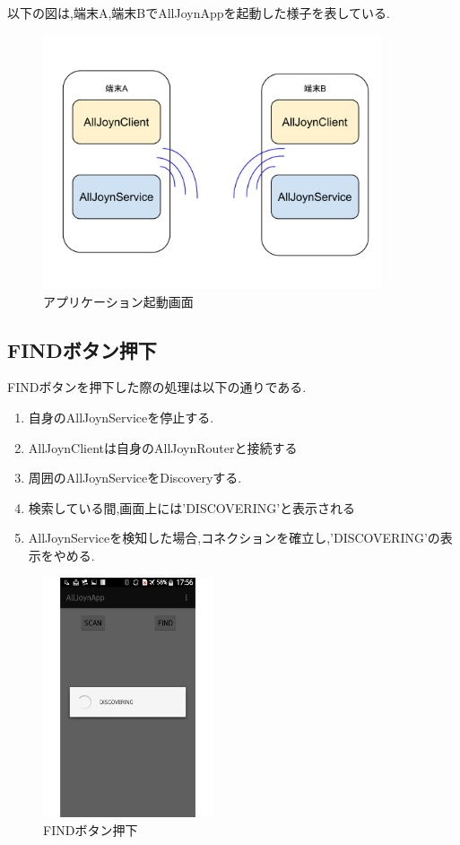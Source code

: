 以下の図は,端末A,端末BでAllJoynAppを起動した様子を表している.

\begin{figure}[htbp]
\centering
\includegraphics[width=10cm]{fig/appstart.pdf}
\caption{アプリケーション起動画面}
\end{figure}



\subsection{FINDボタン押下}
FINDボタンを押下した際の処理は以下の通りである.

\begin{enumerate}
\item 自身のAllJoynServiceを停止する.
\item AllJoynClientは自身のAllJoynRouterと接続する
\item 周囲のAllJoynServiceをDiscoveryする.
\item 検索している間,画面上には'DISCOVERING'と表示される
\item AllJoynServiceを検知した場合,コネクションを確立し,'DISCOVERING'の表示をやめる.
\end{enumerate}

\begin{figure}[htbp]
\centering
\includegraphics[width=5cm]{fig/screen2.pdf}
\caption{FINDボタン押下}
\end{figure}

